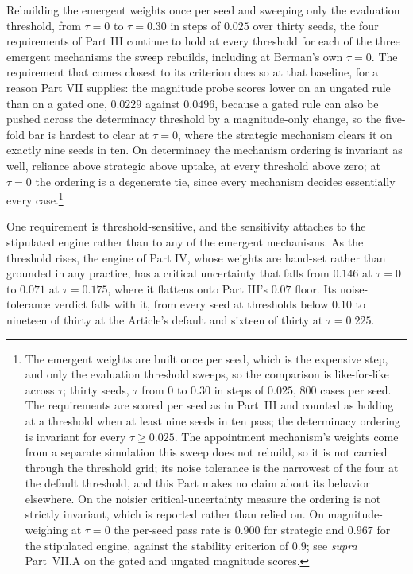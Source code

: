 Rebuilding the emergent weights once per seed and sweeping only the
evaluation threshold, from $\tau = 0$ to $\tau = 0.30$ in steps of
$0.025$ over thirty seeds, the four requirements of Part III continue to
hold at every threshold for each of the three emergent mechanisms the
sweep rebuilds, including at Berman's own $\tau = 0$. The requirement
that comes closest to its criterion does so at that baseline, for a
reason Part VII supplies: the magnitude probe scores lower on an ungated
rule than on a gated one, $0.0229$ against $0.0496$, because a gated rule
can also be pushed across the determinacy threshold by a magnitude-only
change, so the five-fold bar is hardest to clear at $\tau = 0$, where the
strategic mechanism clears it on exactly nine seeds in ten. On determinacy the mechanism ordering is invariant as well, reliance above
strategic above uptake, at every threshold above zero; at $\tau = 0$ the ordering is
a degenerate tie, since every mechanism decides essentially every
case.\footnote{The emergent weights are built once per seed, which is the
expensive step, and only the evaluation threshold sweeps, so the
comparison is like-for-like across $\tau$; thirty seeds, $\tau$ from $0$
to $0.30$ in steps of $0.025$, $800$ cases per seed. The requirements are
scored per seed as in Part~III and counted as holding at a threshold when
at least nine seeds in ten pass; the determinacy ordering is invariant for
every $\tau \geq 0.025$. The appointment mechanism's weights come from a
separate simulation this sweep does not rebuild, so it is not carried
through the threshold grid; its noise tolerance is the narrowest of the
four at the default threshold, and this Part makes no claim about its
behavior elsewhere. On the noisier critical-uncertainty measure the
ordering is not strictly invariant, which is reported rather than relied
on. On magnitude-weighing at $\tau = 0$ the per-seed pass rate is
$0.900$ for strategic and $0.967$ for the stipulated engine, against the
stability criterion of $0.9$; see \textit{supra} Part~VII.A on the gated
and ungated magnitude scores.}

One requirement is threshold-sensitive, and the sensitivity attaches to the
stipulated engine rather than to any of the emergent mechanisms. As the threshold rises, the
engine of Part IV, whose weights are hand-set rather than grounded in any
practice, has a critical uncertainty that falls from $0.146$ at $\tau = 0$ to
$0.071$ at $\tau = 0.175$, where it flattens onto Part III's $0.07$ floor. Its
noise-tolerance verdict falls with it, from every seed at thresholds below
$0.10$ to nineteen of thirty at the Article's default and sixteen of thirty at
$\tau = 0.225$.

